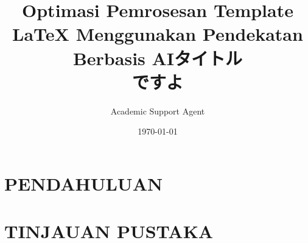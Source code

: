 \documentclass{dicomopapers}
\title{Optimasi Pemrosesan Template LaTeX Menggunakan Pendekatan Berbasis AI}
\author{Academic Support Agent}
\date{\today}
\begin{document}
\maketitle

\begin{abstract}

\end{abstract}

\chapter{PENDAHULUAN}


\chapter{TINJAUAN PUSTAKA}


\usepackage[dvipdfmx]{graphicx}
\usepackage{latexsym}
\usepackage{nidanfloat} %

\def\Underline{\setbox0\hbox\bgroup\let\\\endUnderline}
\def\endUnderline{\vphantom{y}\egroup\smash{\underline{\box0}}\\}
\def\|{\verb|}

\setlength{\Jauthorjreceivesep}{0.0mm}
\setlength{\Jreceivejabstsep}{0.0mm}
\setlength{\Jabstsepjkeyword}{0.0mm}
\setlength{\Jkeywordetitle}{0.0mm}


\makeatletter
\addtolength{\JEhonbunsep}{-\baselineskip}
\setlength{\dblfloatsep}{.3\Cvs \@plus.2\Cvs \@minus.1\Cvs}
\setlength{\dbltextfloatsep}{.3\Cvs \@plus.2\Cvs \@minus.1\Cvs}
\makeatother

\makeatletter
\def\newblock{\hskip .11em\@plus.33em\@minus.07em}
\makeatother

\title{タイトル\\ ですよ}


\end{document}
